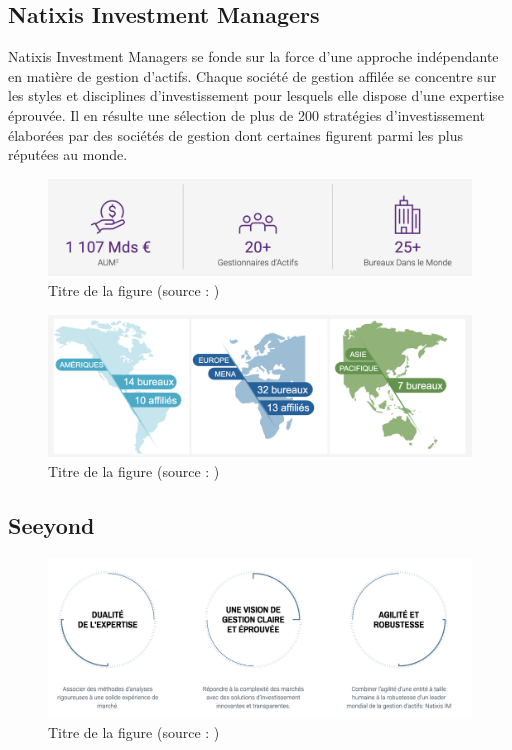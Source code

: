 \subsection*{Natixis Investment Managers}
Natixis Investment Managers se fonde sur la force d’une approche indépendante en matière de gestion d’actifs. Chaque société de gestion affilée se concentre sur les styles et disciplines d'investissement pour lesquels elle dispose d'une expertise éprouvée. Il en résulte une sélection de plus de 200 stratégies d’investissement élaborées par des sociétés de gestion dont certaines figurent parmi les plus réputées au monde.

\begin{figure}[h!]
  \caption{Titre de la figure (source : \cite{ab94})}
  \includegraphics[width=\linewidth]{./img/intro/nim_kpi}
\end{figure}


\begin{figure}[h!]
  \caption{Titre de la figure (source : \cite{m85})}
  \includegraphics[width=\linewidth]{./img/intro/nim_loc}
\end{figure}



\subsection*{Seeyond}


\begin{figure}[h!]
  \caption{Titre de la figure (source : \cite{ah2006})}
  \includegraphics[width=\linewidth]{./img/intro/seeyond_objectifs}
\end{figure}

